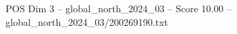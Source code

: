 \begin{textsample}{POS Dim 3 – global\_north\_2024\_03 – Score 10.00 – global\_north\_2024\_03/200269190.txt}
\end{textsample}
